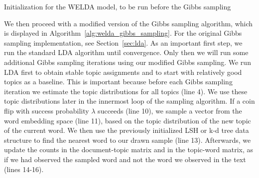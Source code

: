 \documentclass[
        a4paper,
        titlepage,
        twoside,
        parskip,
        numbers=noenddot
        ]{scrbook}
\theoremstyle{break}
\begin{document}

\begin{algorithm}
  \caption{Initialization for the WELDA model, to be run before the Gibbs sampling}
  \label{alg:welda_init}
  \begin{algorithmic}[1]
    \EndFor
    \EndProcedure
  \end{algorithmic}
\end{algorithm}

We then proceed with a modified version of the Gibbs sampling algorithm, which is displayed in Algorithm~\ref{alg:welda_gibbs_sampling}.
For the original Gibbs sampling implementation, see Section~\ref{sec:lda}.
As an important first step, we run the standard LDA algorithm until convergence.
Only then we will run some additional Gibbs sampling iterations using our modified Gibbs sampling.
We run LDA first to obtain stable topic assignments and to start with relatively good topics as a baseline.
This is important because before each Gibbs sampling iteration we estimate the topic distributions for all topics (line 4).
We use these topic distributions later in the innermost loop of the sampling algorithm.
If a coin flip with success probability $\lambda$ succeeds (line 10), we sample a vector from the word embedding space (line 11), based on the topic distribution of the new topic of the current word.
We then use the previously initialized LSH or k-d tree data structure to find the nearest word to our drawn sample (line 13).
Afterwards, we update the counts in the document-topic matrix and in the topic-word matrix, as if we had observed the sampled word and not the word we observed in the text (lines 14-16).
\end{document}
